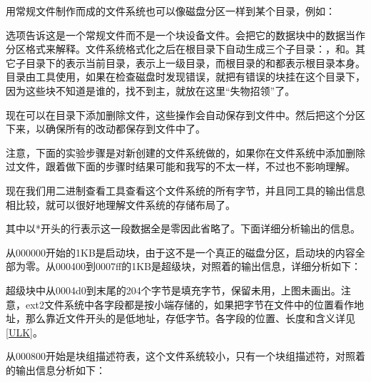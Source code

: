 用常规文件制作而成的文件系统也可以像磁盘分区一样到某个目录，例如：




选项告诉这是一个常规文件而不是一个块设备文件。会把它的数据块中的数据当作分区格式来解释。文件系统格式化之后在根目录下自动生成三个子目录：，和。其它子目录下的表示当前目录，表示上一级目录，而根目录的和都表示根目录本身。目录由工具使用，如果在检查磁盘时发现错误，就把有错误的块挂在这个目录下，因为这些块不知道是谁的，找不到主，就放在这里“失物招领”了。



现在可以在目录下添加删除文件，这些操作会自动保存到文件中。然后把这个分区下来，以确保所有的改动都保存到文件中了。




注意，下面的实验步骤是对新创建的文件系统做的，如果你在文件系统中添加删除过文件，跟着做下面的步骤时结果可能和我写的不太一样，不过也不影响理解。



现在我们用二进制查看工具查看这个文件系统的所有字节，并且同工具的输出信息相比较，就可以很好地理解文件系统的存储布局了。




其中以*开头的行表示这一段数据全是零因此省略了。下面详细分析输出的信息。



从000000开始的1KB是启动块，由于这不是一个真正的磁盘分区，启动块的内容全部为零。从000400到0007ff的1KB是超级块，对照着的输出信息，详细分析如下：




超级块中从0004d0到末尾的204个字节是填充字节，保留未用，上图未画出。注意，ext2文件系统中各字段都是按小端存储的，如果把字节在文件中的位置看作地址，那么靠近文件开头的是低地址，存低字节。各字段的位置、长度和含义详见\hyperlink{db.bi01.bibli.ulk}{[ULK]}。



从000800开始是块组描述符表，这个文件系统较小，只有一个块组描述符，对照着的输出信息分析如下：


